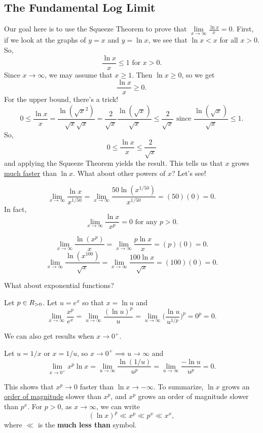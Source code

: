 \subsection{The Fundamental Log Limit}
Our goal here is to use the Squeeze Theorem to prove that $ \lim\limits_{{x} \to {\infty}}\frac{\ln x}{x}=0 $. First,
if we look at the graphs of $ y=x $ and $ y=\ln x $, we see that $ \ln x<x $ for all $ x>0 $. So,
\[ \frac{\ln x}{x}\le 1\text{ for $x>0$}. \]
Since $ x\to\infty $, we may assume that $ x\ge 1 $. Then $ \ln x\ge 0 $, so we get
\[ \frac{\ln x}{x}\ge 0. \]
For the upper bound, there's a trick!
\[ 0\le \frac{\ln x}{x}=\frac{\ln(\sqrt{x}^2)}{\sqrt{x}\sqrt{x}}=\frac{2}{\sqrt{x}}\frac{\ln(\sqrt{x})}{\sqrt{x}}\le \frac{2}{\sqrt{x}}\text{ since }\frac{\ln(\sqrt{x})}{\sqrt{x}}\le 1. \]
So,
\[ 0\le \frac{\ln x}{x}\le \frac{2}{\sqrt{x}} \]
and applying the Squeeze Theorem yields the result. This tells us that $ x $ grows \underline{much faster} than $ \ln x $. What about other powers of $ x $? Let's see!
\begin{Example}{}{}
    \[ \lim\limits_{{x} \to {\infty}}\frac{\ln x}{x^{1/50}}=\lim\limits_{{x} \to {\infty}}\frac{50\ln(x^{1/50})}{x^{1/50}}=(50)(0)=0. \]
    In fact,
    \[ \lim\limits_{{x} \to {\infty}}\frac{\ln x}{x^p}=0\text{ for any }p>0. \]
\end{Example}
\begin{Example}{}{}
    \[ \lim\limits_{{x} \to {\infty}}\frac{\ln (x^p)}{x}=\lim\limits_{{x} \to {\infty}}\frac{p \ln x}{x}=(p)(0)=0. \]
    \[ \lim\limits_{{x} \to {\infty}}\frac{\ln (x^{100})}{\sqrt{x}}=\lim\limits_{{x} \to {\infty}}\frac{100\ln x}{\sqrt{x}}=(100)(0)=0. \]
\end{Example}
What about exponential functions?
\begin{Example}{}{}
    Let $ p\in\relax{R}_{>0} $. Let $ u=e^x $ so that $ x=\ln u $ and
    \[ \lim\limits_{{x} \to {\infty}}\frac{x^p}{e^x}=\lim\limits_{{u} \to {\infty}}\frac{(\ln u)^p}{u}=
        \lim\limits_{{u} \to {\infty}}\biggl(\frac{\ln u}{u^{1/p}}\biggr)^{\!p}=0^p=0. \]
\end{Example}
We can also get results when $ x\to 0^+ $.
\begin{Example}{}{}
    Let $ u=1/x $ or $ x=1/u $, so $ x\to 0^+\implies u\to \infty $ and
    \[ \lim\limits_{{x} \to {0^+}}x^p\ln x=\lim\limits_{{u} \to {\infty}}\frac{\ln(1/u)}{u^p}
        =\lim\limits_{{u} \to {\infty}}\frac{-\ln u}{u^p}=0. \]
\end{Example}
This shows that $ x^p\to 0 $ faster than $ \ln x\to-\infty $. To summarize, $ \ln x $ grows an \underline{order of magnitude}
slower than $ x^p $, and $ x^p $ grows an order of magnitude slower than $ p^x $. For $ p>0 $, as $ x\to\infty $, we can write
\[ (\ln x)^p\ll x^p\ll p^x\ll x^x, \]
where $ \ll $ is the \textbf{much less than} symbol.
